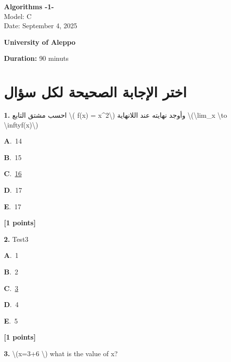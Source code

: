 \documentclass[12pt]{article}
\newcommand{\choice}[3]{%
  \noindent\textbf{#1}.~#2\hfill#3\par\vspace{0.25em}
}
\begin{document}
\begin{flushright}
{\Large \textbf{{\textenglish{Algorithms -1-}}}}\\[0.25em]
{\normalsize \textenglish{Model: }{\textenglish{C}}}\\[0.1em]
{\normalsize \textenglish{Date: }{\textenglish{September 4, 2025}}}
\end{flushright}

\vspace{0.6cm}

\noindent
\begin{minipage}[t]{0.65\textwidth}
  \raggedright
  \textbf{{\textenglish{University of Aleppo}}}\\[0.3em]
\end{minipage}\hfill
\begin{minipage}[t]{0.3\textwidth}
  \raggedleft
  \textenglish{\textbf{Duration: }}{\textenglish{90 minuts}}
\end{minipage}

\vspace{0.9cm}

\section*{اختر الإجابة الصحيحة لكل سؤال}

\noindent \textbf{\textenglish{1.}} {\textarabic{احسب مشتق التابع \textbackslash{}( f(x) = x\^{}2\textbackslash{}) وأوجد نهايته عند اللانهاية \textbackslash{}(\textbackslash{}lim\_{x \textbackslash{}to \textbackslash{}infty}f(x)\textbackslash{})}}

\noindent\choice{A}{{\textenglish{14}}}{}
\noindent\choice{B}{{\textenglish{15}}}{}
\noindent\choice{C}{\underline{{\textenglish{16}}}}{}
\noindent\choice{D}{{\textenglish{17}}}{}
\noindent\choice{E}{{\textenglish{17}}}{}
\hfill \textbf{[1 points]}\vspace{0.5em}

\noindent \textbf{\textenglish{2.}} {\textenglish{Test3}}

\noindent\choice{A}{{\textenglish{1}}}{}
\noindent\choice{B}{{\textenglish{2}}}{}
\noindent\choice{C}{\underline{{\textenglish{3}}}}{}
\noindent\choice{D}{{\textenglish{4}}}{}
\noindent\choice{E}{{\textenglish{5}}}{}
\hfill \textbf{[1 points]}\vspace{0.5em}

\noindent \textbf{\textenglish{3.}} {\textenglish{\textbackslash{}(x=3+6 \textbackslash{}) what is the value of x?}}
\end{document}
